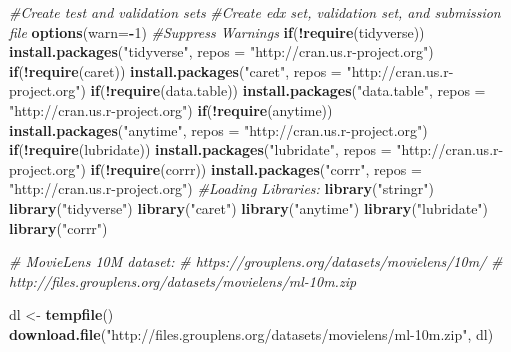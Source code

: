 \documentclass[
]{article}
\newenvironment{Shaded}{\begin{snugshade}}{\end{snugshade}}
\newcommand{\CommentTok}[1]{\textcolor[rgb]{0.56,0.35,0.01}{\textit{#1}}}
\newcommand{\ControlFlowTok}[1]{\textcolor[rgb]{0.13,0.29,0.53}{\textbf{#1}}}
\newcommand{\DataTypeTok}[1]{\textcolor[rgb]{0.13,0.29,0.53}{#1}}
\newcommand{\DecValTok}[1]{\textcolor[rgb]{0.00,0.00,0.81}{#1}}
\newcommand{\KeywordTok}[1]{\textcolor[rgb]{0.13,0.29,0.53}{\textbf{#1}}}
\newcommand{\NormalTok}[1]{#1}
\newcommand{\OperatorTok}[1]{\textcolor[rgb]{0.81,0.36,0.00}{\textbf{#1}}}
\newcommand{\StringTok}[1]{\textcolor[rgb]{0.31,0.60,0.02}{#1}}
\begin{document}
\begin{Shaded}
\begin{Highlighting}[]
 \CommentTok{#Create test and validation sets}
 \CommentTok{#Create edx set, validation set, and submission file}
\KeywordTok{options}\NormalTok{(}\DataTypeTok{warn=}\OperatorTok{-}\DecValTok{1}\NormalTok{) }\CommentTok{#Suppress Warnings}
\ControlFlowTok{if}\NormalTok{(}\OperatorTok{!}\KeywordTok{require}\NormalTok{(tidyverse)) }\KeywordTok{install.packages}\NormalTok{(}\StringTok{"tidyverse"}\NormalTok{, }\DataTypeTok{repos =} \StringTok{"http://cran.us.r-project.org"}\NormalTok{)}
\ControlFlowTok{if}\NormalTok{(}\OperatorTok{!}\KeywordTok{require}\NormalTok{(caret)) }\KeywordTok{install.packages}\NormalTok{(}\StringTok{"caret"}\NormalTok{, }\DataTypeTok{repos =} \StringTok{"http://cran.us.r-project.org"}\NormalTok{)}
\ControlFlowTok{if}\NormalTok{(}\OperatorTok{!}\KeywordTok{require}\NormalTok{(data.table)) }\KeywordTok{install.packages}\NormalTok{(}\StringTok{"data.table"}\NormalTok{, }\DataTypeTok{repos =} \StringTok{"http://cran.us.r-project.org"}\NormalTok{)}
\ControlFlowTok{if}\NormalTok{(}\OperatorTok{!}\KeywordTok{require}\NormalTok{(anytime)) }\KeywordTok{install.packages}\NormalTok{(}\StringTok{"anytime"}\NormalTok{, }\DataTypeTok{repos =} \StringTok{"http://cran.us.r-project.org"}\NormalTok{)}
\ControlFlowTok{if}\NormalTok{(}\OperatorTok{!}\KeywordTok{require}\NormalTok{(lubridate)) }\KeywordTok{install.packages}\NormalTok{(}\StringTok{"lubridate"}\NormalTok{, }\DataTypeTok{repos =} \StringTok{"http://cran.us.r-project.org"}\NormalTok{)}
\ControlFlowTok{if}\NormalTok{(}\OperatorTok{!}\KeywordTok{require}\NormalTok{(corrr)) }\KeywordTok{install.packages}\NormalTok{(}\StringTok{"corrr"}\NormalTok{, }\DataTypeTok{repos =} \StringTok{"http://cran.us.r-project.org"}\NormalTok{)}
\CommentTok{#Loading Libraries:}
\KeywordTok{library}\NormalTok{(}\StringTok{"stringr"}\NormalTok{)}
\KeywordTok{library}\NormalTok{(}\StringTok{"tidyverse"}\NormalTok{)}
\KeywordTok{library}\NormalTok{(}\StringTok{"caret"}\NormalTok{)}
\KeywordTok{library}\NormalTok{(}\StringTok{"anytime"}\NormalTok{)}
\KeywordTok{library}\NormalTok{(}\StringTok{"lubridate"}\NormalTok{)}
\KeywordTok{library}\NormalTok{(}\StringTok{"corrr"}\NormalTok{)}

\CommentTok{# MovieLens 10M dataset:}
 \CommentTok{# https://grouplens.org/datasets/movielens/10m/}
 \CommentTok{# http://files.grouplens.org/datasets/movielens/ml-10m.zip}

\NormalTok{dl <-}\StringTok{ }\KeywordTok{tempfile}\NormalTok{()}
 \KeywordTok{download.file}\NormalTok{(}\StringTok{"http://files.grouplens.org/datasets/movielens/ml-10m.zip"}\NormalTok{, dl)}


\end{Highlighting}
\end{Shaded}
\end{document}
